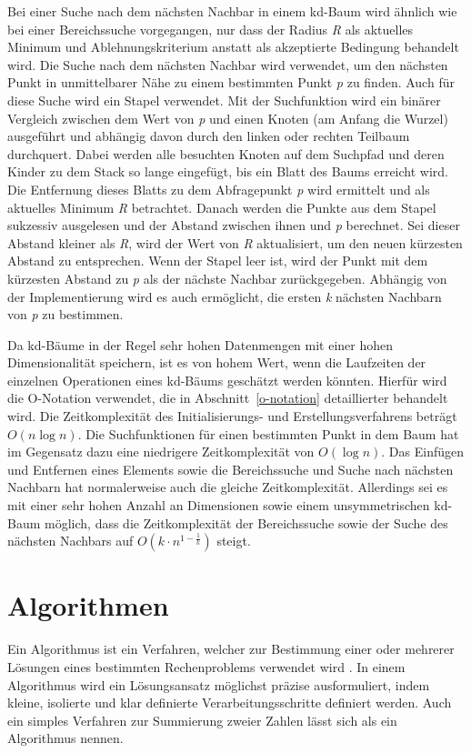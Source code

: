Bei einer Suche nach dem nächsten Nachbar in einem kd-Baum wird ähnlich wie bei einer Bereichssuche vorgegangen, nur dass der Radius \textit{R} als aktuelles Minimum und Ablehnungskriterium anstatt als akzeptierte Bedingung behandelt wird. Die Suche nach dem nächsten Nachbar wird verwendet, um den nächsten Punkt in unmittelbarer Nähe zu einem bestimmten Punkt \textit{p} zu finden. Auch für diese Suche wird ein Stapel verwendet. Mit der Suchfunktion wird ein binärer Vergleich zwischen dem Wert von \textit{p} und einen Knoten (am Anfang die Wurzel) ausgeführt und abhängig davon durch den linken oder rechten Teilbaum durchquert. Dabei werden alle besuchten Knoten auf dem Suchpfad und deren Kinder zu dem Stack so lange eingefügt, bis ein Blatt des Baums erreicht wird. Die Entfernung dieses Blatts zu dem Abfragepunkt \textit{p} wird ermittelt und als aktuelles Minimum \textit{R} betrachtet. Danach werden die Punkte aus dem Stapel sukzessiv ausgelesen und der Abstand zwischen ihnen und \textit{p} berechnet. Sei dieser Abstand kleiner als \textit{R}, wird der Wert von \textit{R} aktualisiert, um den neuen kürzesten Abstand zu entsprechen. Wenn der Stapel leer ist, wird der Punkt mit dem kürzesten Abstand zu \textit{p} als der nächste Nachbar zurückgegeben. Abhängig von der Implementierung wird es auch ermöglicht, die ersten \textit{k} nächsten Nachbarn von \textit{p} zu bestimmen. \autocite[96]{saha_advanced_2019}

Da kd-Bäume in der Regel sehr hohen Datenmengen mit einer hohen Dimensionalität speichern, ist es von hohem Wert, wenn die Laufzeiten der einzelnen Operationen eines kd-Bäums geschätzt werden könnten. Hierfür wird die O-Notation verwendet, die in Abschnitt~\ref{o-notation} detaillierter behandelt wird. Die Zeitkomplexität des Initialisierungs- und Erstellungsverfahrens beträgt $O(n\log n)$. Die Suchfunktionen für einen bestimmten Punkt in dem Baum hat im Gegensatz dazu eine niedrigere Zeitkomplexität von $O(\log n)$. Das Einfügen und Entfernen eines Elements sowie die Bereichssuche und Suche nach nächsten Nachbarn hat normalerweise auch die gleiche Zeitkomplexität. Allerdings sei es mit einer sehr hohen Anzahl an Dimensionen sowie einem unsymmetrischen  kd-Baum möglich, dass die Zeitkomplexität der Bereichssuche sowie der Suche des nächsten Nachbars auf $O(k \cdot n^{1-\frac{1}{k}})$ steigt. \autocite[104-105]{bentley_fast_1978} \autocite[94-96]{saha_advanced_2019}

\section{Algorithmen}
Ein Algorithmus ist ein Verfahren, welcher zur Bestimmung einer oder mehrerer Lösungen eines bestimmten Rechenproblems verwendet wird \autocite[1]{knebl_algorithmen_2021}. In einem Algorithmus wird ein Lösungsansatz möglichst präzise ausformuliert, indem kleine, isolierte und klar definierte Verarbeitungsschritte definiert werden. Auch ein simples Verfahren zur Summierung zweier Zahlen lässt sich als ein Algorithmus nennen. \autocite[9-10]{hubwieser_fundamente_2015}

